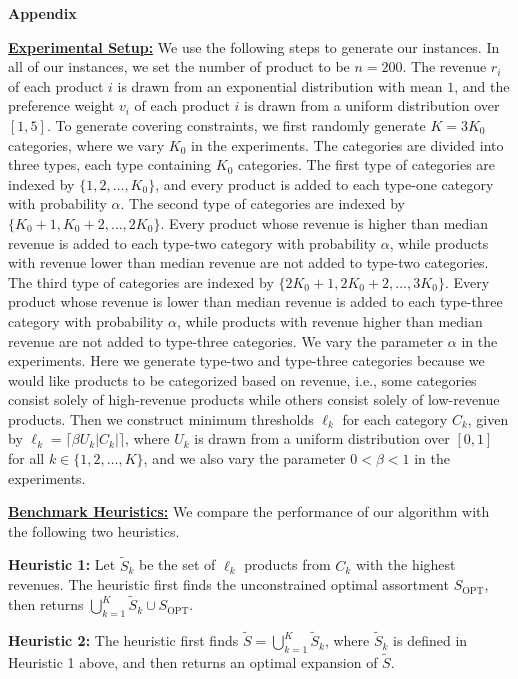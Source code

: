 \documentclass[msom,non-blindrev]{informs3} %
\theoremstyle{definition}
\begin{document}
\begin{appendices}{\Large \noindent\textbf{Appendix}}
{\noindent\underline{\bf Experimental Setup:} We use the following steps to generate our instances. In all of our instances, we set the number of product to be $n=200$. The revenue $r_i$ of each product $i$ is drawn from an exponential distribution with mean $1$, and the preference weight $v_i$ of each product $i$ is drawn from a uniform distribution over $[1,5]$. To generate covering constraints, we first randomly generate $K=3K_0$ categories, where we vary $K_0$ in the experiments. The categories are divided into three types, each type containing $K_0$ categories. The first type of categories are indexed by $\{1,2,\dots,K_0\}$, and every product is added to each type-one category with probability $\alpha$. The second type of categories are indexed by $\{K_0+1,K_0+2,\dots,2K_0\}$. Every product whose revenue is higher than median revenue is added to each type-two category with probability $\alpha$, while products with revenue lower than median revenue are not added to type-two categories. The third type of categories are indexed by $\{2K_0+1,2K_0+2,\dots,3K_0\}$. Every product whose revenue is lower than median revenue is added to each type-three category with probability $\alpha$, while products with revenue higher than median revenue are not added to type-three categories. We vary the parameter $\alpha$ in the experiments. Here we generate type-two and type-three categories because we would like products to be categorized based on revenue, i.e., some categories consist solely of high-revenue products while others consist solely of low-revenue products. Then we construct minimum thresholds $\ell_k$ for each category $C_k$, given by $\ell_k=\lceil \beta U_k|C_k|\rceil$, where $U_k$ is drawn from a uniform distribution over $[0,1]$ for all $k\in\{1,2,\dots,K\}$, and we also vary the parameter $0<\beta<1$ in the experiments.

\noindent\underline{\bf Benchmark Heuristics:} We compare the performance of our algorithm with the following two heuristics.

\noindent\textbf{Heuristic 1:} Let $\tilde{S}_k$ be the set of $\ell_k$ products from $C_k$ with the highest revenues. The heuristic first finds the unconstrained optimal assortment $S_{\text{OPT}}$, then returns $\bigcup_{k=1}^K \tilde{S}_k\cup S_{\text{OPT}}$.

\noindent\textbf{Heuristic 2:} The heuristic first finds $\tilde{S}=\bigcup_{k=1}^K \tilde{S}_k$, where $\tilde{S}_k$ is defined in Heuristic 1 above, and then returns an optimal expansion of $\tilde{S}$.

}
\end{appendices}
\end{document}
